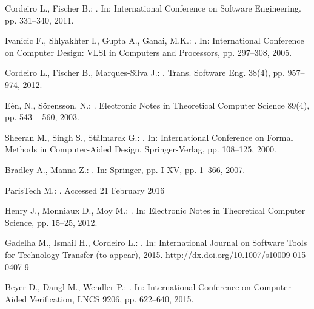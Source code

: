 \documentclass{acm_sen_article}
\begin{document}
{{\begin{thebibliography}{1}
Cordeiro L., Fischer B.:
.
\newblock In: International Conference on Software Engineering. pp. 331--340, 2011.

Ivanicic F., Shlyakhter I., Gupta A., Ganai, M.K.:
.
\newblock In: International Conference on Computer Design: VLSI in Computers and Processors, pp. 297--308, 2005.

Cordeiro L., Fischer B., Marques{-}Silva J.:
.
 Trans. Software Eng. 38(4), pp. 957--974, 2012.

E{\'{e}}n, N., S{\"{o}}rensson, N.:
.
\newblock Electronic Notes in Theoretical Computer Science 89(4), pp. 543 -- 560, 2003.

Sheeran M., Singh S., St{\aa}lmarck G.:
.
\newblock In: International Conference on Formal Methods in Computer-Aided Design. Springer-Verlag, pp. 108--125, 2000.

Bradley A., Manna Z.:
. 
\newblock In: Springer, pp. I-XV, pp. 1--366, 2007.

ParisTech M.:
. 
\newblock Accessed 21 February 2016

Henry J., Monniaux D., Moy M.: 
. 
\newblock In: Electronic Notes in Theoretical Computer Science, pp. 15--25, 2012.

Gadelha M., Ismail H., Cordeiro L.:
.
\newblock In: International Journal on Software Tools for Technology Transfer (to appear), 2015.
\newblock http://dx.doi.org/10.1007/s10009-015-0407-9

Beyer D., Dangl M., Wendler P.:
.
\newblock In: International Conference on Computer-Aided Verification, LNCS 9206, pp. 622--640, 2015.


\end{thebibliography}}}
\end{document}
